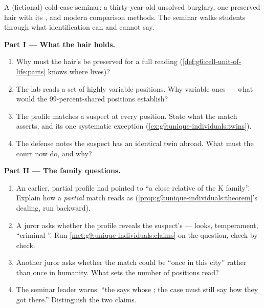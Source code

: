 \begin{problem}\label{pb:g9:unique-individuals:1}
A (fictional) cold-case seminar: a thirty-year-old
unsolved burglary, one preserved hair with its 
, and modern comparison methods. The seminar walks
students through what  identification can and cannot
say.

\medskip\noindent\textbf{Part I --- What the hair
holds.}
\begin{enumerate}
  \item Why must the hair's \emph{} be preserved for
        a full reading (\cref{def:g6:cell-unit-of-life:parts}
        knows where  lives)?
  \item The lab reads a set of highly variable
        positions. Why variable ones --- what would the
        99-percent-shared positions establish?
  \item The profile matches a suspect at every position.
        State what the match asserts, and its one
        systematic exception
        (\cref{ex:g9:unique-individuals:twins}).
  \item The defense notes the suspect has an identical
        twin abroad. What must the court now do, and
        why?
\end{enumerate}

\medskip\noindent\textbf{Part II --- The family
questions.}
\begin{enumerate}[resume]
  \item An earlier, partial profile had pointed to ``a
        close relative of the K family''. Explain how a
        \emph{partial} match reads as 
        (\cref{prop:g9:unique-individuals:theorem}'s
        dealing, run backward).
  \item A juror asks whether the profile reveals the
        suspect's  --- looks, temperament,
        ``criminal ''. Run
        \cref{met:g9:unique-individuals:claims} on the
        question, check by check.
  \item Another juror asks whether the match could be
        ``once in this city'' rather than once in
        humanity. What sets the number of positions
        read?
  \item The seminar leader warns: ``the  says
        whose ; the case must still say how they
        got there.'' Distinguish the two claims.
\end{enumerate}


\end{problem}

